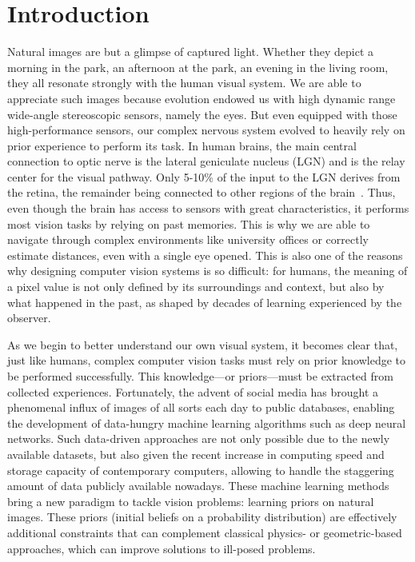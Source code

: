 \chapter*{Introduction}         %

Natural images are but a glimpse of captured light. Whether they depict a morning in the park, an afternoon at the park, an evening in the living room, they all resonate strongly with the human visual system. We are able to appreciate such images because evolution endowed us with high dynamic range wide-angle stereoscopic sensors, namely the eyes. But even equipped with those high-performance sensors, our complex nervous system evolved to heavily rely on prior experience to perform its task. In human brains, the main central connection to optic nerve is the lateral geniculate nucleus (LGN) and is the relay center for the visual pathway. Only 5-10\% of the input to the LGN derives from the retina, the remainder being connected to other regions of the brain~\cite{van2000relative}. Thus, even though the brain has access to sensors with great characteristics, it performs most vision tasks by relying on past memories. This is why we are able to navigate through complex environments like university offices or correctly estimate distances, even with a single eye opened.
This is also one of the reasons why designing computer vision systems is so difficult: for humans, the meaning of a pixel value is not only defined by its surroundings and context, but also by what happened in the past, as shaped by decades of learning experienced by the observer. 

As we begin to better understand our own visual system, it becomes clear that, just like humans, complex computer vision tasks must rely on prior knowledge to be performed successfully. This knowledge---or priors---must be extracted from collected experiences. Fortunately, the advent of social media has brought a phenomenal influx of images of all sorts each day to public databases, enabling the development of data-hungry machine learning algorithms such as deep neural networks. Such data-driven approaches are not only possible due to the newly available datasets, but also given the recent increase in computing speed and storage capacity of contemporary computers, allowing to handle the staggering amount of data publicly available nowadays. These machine learning methods bring a new paradigm to tackle vision problems: learning priors on natural images. These priors (initial beliefs on a probability distribution) are effectively additional constraints that can complement classical physics- or geometric-based approaches, which can improve solutions to ill-posed problems. 

